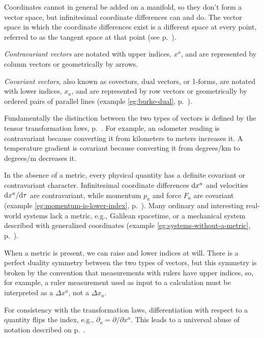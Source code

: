 \documentclass{genrel}
\begin{document}
Coordinates cannot in general be added on a manifold, so they don't form a vector space,
but infinitesimal coordinate differences can and do. The vector space in which the
coordinate differences exist is a different space at every point, referred to as the
tangent space at that point (see p.~\pageref{tangent-space}).

\emph{Contravariant vectors} are notated with upper indices, $x^a$, and are represented by column vectors
or geometrically by arrows.

\emph{Covariant vectors}, also known as covectors, dual vectors, or 1-forms,
are notated with lower indices, $x_a$, and are represented by row vectors
or geometrically by ordered pairs of parallel lines (example \ref{eg:burke-dual}, p.~\pageref{eg:burke-dual}).

Fundamentally the distinction between the two types of vectors is defined by the tensor
transformation laws, p.~\pageref{sec:tensor-transformation-law}. For example, an odometer reading is
contravariant because converting it from kilometers to meters increases it. A temperature
gradient is covariant because converting it from degrees/km to degrees/m decreases it.

In the absence of a metric, every physical quantity has a definite covariant or contravariant
character. Infinitesimal coordinate differences $\textup{d} x^a$ and velocities $\textup{d} x^a/\textup{d}\tau$
are contravariant, while momentum $p_a$ and force $F_a$ are covariant (example
\ref{eg:momentum-is-lower-index}, p.~\pageref{eg:momentum-is-lower-index}).
Many ordinary and interesting real-world systems lack a metric, e.g.,
Galilean spacetime, or a mechanical system described with generalized coordinates
(example \ref{eg:systems-without-a-metric}, p.~\pageref{eg:systems-without-a-metric}).

When a metric is present, we can raise and lower indices at will.
There is a perfect duality symmetry between the two types of vectors, but
this symmetry is broken by the convention that measurements with rulers have upper indices,
so, for example, a ruler measurement used as input to a calculation must be interpreted as
a $\Delta x^a$, not a $\Delta x_a$.

For consistency with the transformation laws,
differentiation with respect to a quantity flips the index, e.g., $\partial_{a}=\partial/\partial x^a$.
This leads to a universal abuse of notation described on p.~\pageref{abuse-of-notation}.
\end{document}
